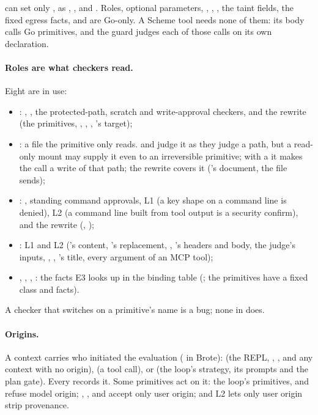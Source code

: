  can set only ,  as
, ,  and
. Roles, optional parameters, ,
, , the taint fields, the fixed egress facts,
 and  are Go-only. A Scheme tool needs
none of them: its body calls Go primitives, and the guard judges each of
those calls on its own declaration.

\paragraph{Roles are what checkers read.} Eight are in use:
\begin{itemize}
\item {}: , , the protected-path,
  scratch and write-approval checkers, and the  rewrite
  (the  primitives, , ,
  , 's target);
\item {}: a file the primitive only reads.  and
   judge it as they judge a path, but a read-only mount
  may supply it even to an irreversible primitive; with a  it
  makes the call a write of that path; the  rewrite covers
  it ('s document, the file 
  sends);
\item {}: , standing command approvals, L1 (a
  key shape on a command line is denied), L2 (a command line built from
  tool output is a security confirm), and the  rewrite
  (, );
\item {}: L1 and L2 ('s content,
  's replacement, , 's
  headers and body, the judge's inputs, ,
  , 's title, every argument of
  an MCP tool);
\item {}, , , : the
  facts E3 looks up in the binding table (; the
   primitives have a fixed class and facts).
\end{itemize}
A checker that switches on a primitive's name is a bug; none in
 does.

\paragraph{Origins.} A context carries who initiated the evaluation
( in Brote):  (the REPL, ,
, and any context with no origin),  (a tool
call), or  (the loop's strategy, its prompts and the plan
gate). Every  records it. Some primitives act on it:
the loop's primitives,  and  refuse model
origin; , ,
 and  accept only user origin; and
L2 lets only user origin strip provenance.

